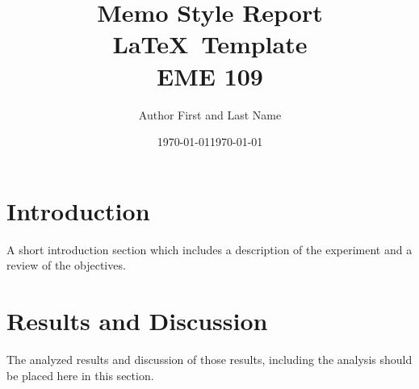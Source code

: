 \documentclass[12pt,letterpaper]{article}
\title{Memo Style Report \\ \LaTeX\ Template \\ EME 109} 	%
\author{Author First and Last Name}				%
\date{\today}									    %
\title{\thetitle}
\author{\theauthor}
\date{\today}
\begin{document}
\maketitle %


\section{Introduction}

A short introduction section which includes a description of the experiment and a review of the objectives.




\section{Results and Discussion}

The analyzed results and discussion of those results, including the analysis should be placed here in this section. \\ 
\end{document}
